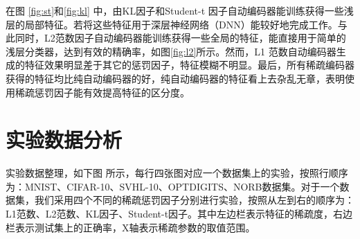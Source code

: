 \documentclass[oneside]{ZJUthesis}
\begin{document}
在图 \ref{fig:st}和\ref{fig:kl} 中，由KL因子和Student-t 因子自动编码器能训练获得一些浅层的局部特征。若将这些特征用于深层神经网络（DNN）能较好地完成工作。与此同时，L2范数因子自动编码器能训练获得一些全局的特征，能直接用于简单的浅层分类器，达到有效的精确率，如图\ref{fig:l2}所示。然而，L1 范数自动编码器生成的特征效果明显差于其它的惩罚因子，特征模糊不明显。最后，所有稀疏编码器获得的特征均比纯自动编码器的好，纯自动编码器的特征看上去杂乱无章，表明使用稀疏惩罚因子能有效提高特征的区分度。



\section{实验数据分析}
实验数据整理，如下图\label{fig:sparsitylevel} 所示，每行四张图对应一个数据集上的实验，按照行顺序为：MNIST、CIFAR-10、SVHL-10、OPTDIGITS、NORB数据集。对于一个数据集，我们采用四个不同的稀疏惩罚因子分别进行实验，按照从左到右的顺序为：L1范数、L2范数、KL因子、Student-t因子。其中左边栏表示特征的稀疏度，右边栏表示测试集上的正确率，X轴表示稀疏参数的取值范围。
\end{document}
